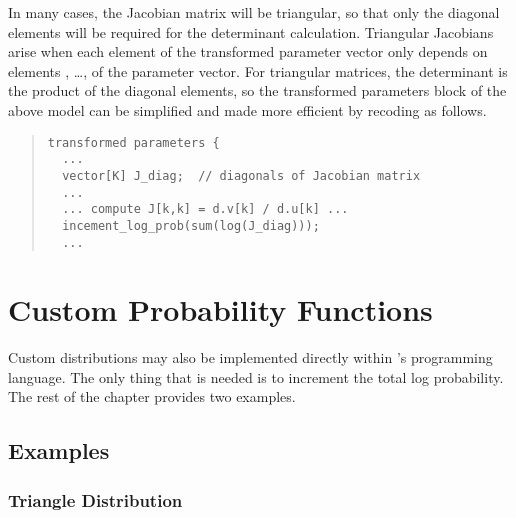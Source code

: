 In many cases, the Jacobian matrix will be triangular, so that only
the diagonal elements will be required for the determinant
calculation.  Triangular Jacobians arise when each element 
of the transformed parameter vector only depends on elements
, \ldots,  of the parameter vector.  For
triangular matrices, the determinant is the product of the diagonal
elements, so the transformed parameters block of the above model can
be simplified and made more efficient by recoding as follows.
%
\begin{quote}
\begin{Verbatim}[fontsize=\small]
transformed parameters {
  ...
  vector[K] J_diag;  // diagonals of Jacobian matrix
  ... 
  ... compute J[k,k] = d.v[k] / d.u[k] ...
  incement_log_prob(sum(log(J_diag)));
  ...
\end{Verbatim}
\end{quote}



\chapter{Custom Probability Functions}%
\label{custom-probability-functions.chapter}

\noindent
Custom distributions may also be implemented directly within \Stan's
programming language.  The only thing that is needed is to increment
the total log probability.  The rest of the chapter provides two
examples.

\section{Examples}

\subsection{Triangle Distribution}


